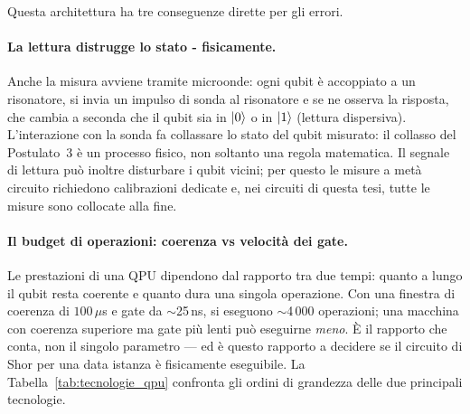 Questa architettura ha tre conseguenze dirette per gli errori.

\paragraph{La lettura distrugge lo stato - fisicamente.}
Anche la misura avviene tramite microonde: ogni qubit è accoppiato a un risonatore, si invia un impulso di sonda al risonatore e se ne osserva la risposta, che cambia a seconda che il qubit sia in $\ket{0}$ o in $\ket{1}$ (lettura dispersiva). L'interazione con la sonda fa collassare lo stato del qubit misurato: il collasso del Postulato~3 è un processo fisico, non soltanto una regola matematica. Il segnale di lettura può inoltre disturbare i qubit vicini; per questo le misure a metà circuito richiedono calibrazioni dedicate e, nei circuiti di questa tesi, tutte le misure sono collocate alla fine.

\paragraph{Il budget di operazioni: coerenza vs velocità dei gate.}
Le prestazioni di una QPU dipendono dal rapporto tra due tempi: quanto a lungo il qubit resta coerente e quanto dura una singola operazione. Con una finestra di coerenza di $100\,\mu$s e gate da $\sim$25\,ns, si eseguono $\sim$4\,000 operazioni; una macchina con coerenza superiore ma gate più lenti può eseguirne \emph{meno}. È il rapporto che conta, non il singolo parametro --- ed è questo rapporto a decidere se il circuito di Shor per una data istanza è fisicamente eseguibile. La Tabella~\ref{tab:tecnologie_qpu} confronta gli ordini di grandezza delle due principali tecnologie.

